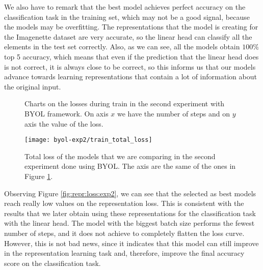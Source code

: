 We also have to remark that the best model achieves perfect accuracy on the classification task in the training set, which may not be a good signal, because the models may be overfitting. The representations that the model is creating for the Imagenette dataset are very accurate, so the linear head can classify all the elements in the test set correctly. Also, as we can see, all the models obtain $100\%$ top 5 accuracy, which means that even if the prediction that the linear head does is not correct, it is always close to be correct, so this informs us that our models advance towards learning representations that contain a lot of information about the original input.


\begin{figure}[htp] 
    \centering
    \hfill%
        \caption{Charts on the losses during train in the second experiment with BYOL framework. On axis $x$ we have the number of steps and on $y$ axis the value of the loss.}
        \label{fig:byol:exp2:both:losses}
\end{figure}

\begin{figure}[H]
\centering
\texttt{[image: byol-exp2/train\_total\_loss]}%
\caption{Total loss of the models that we are comparing in the second experiment done using BYOL. The axis are the same of the ones in Figure \ref{fig:byol:exp2:both:losses}. }
\label{fig:byol:total:loss:exp2}%
\end{figure}

Observing Figure \ref{fig:repr:loss:exp2}, we can see that the selected as best models reach really low values on the representation loss. This is consistent with the results that we later obtain using these representations for the classification task with the linear head. The model with the biggest batch size performs the fewest number of steps, and it does not achieve to completely flatten the loss curve. However, this is not bad news, since it indicates that this model can still improve in the representation learning task and, therefore, improve the final accuracy score on the classification task.

